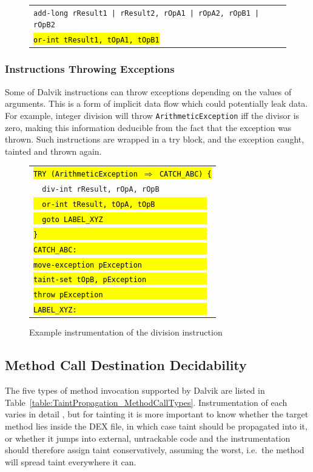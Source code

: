 \documentclass[12pt,twoside,notitlepage]{report}
\newcommand{\centerbox}[1] {
	\begin{center}
	\begin{footnotesize}
	\begin{tabular}{l}
		#1
	\end{tabular}
	\end{footnotesize}
	\end{center}
}
\newcommand{\asm}[1] {\texttt{#1}}
\newcommand{\asmExtra}[1] {\texttt{\hl{#1}}}
\begin{document}
	\begin{figure}[H]
		\centerbox{
			\asm{add-long rResult1 | rResult2, rOpA1 | rOpA2, rOpB1 | rOpB2} \\
			\asmExtra{or-int tResult1, tOpA1, tOpB1}
		}
	\end{figure}

\subsubsection{Instructions Throwing Exceptions}

Some of Dalvik instructions can throw exceptions depending on the values of arguments. This is a form of implicit data flow which could potentially leak data. For example, integer division will throw \verb$ArithmeticException$ iff the divisor is zero, making this information deducible from the fact that the exception was thrown. Such instructions are wrapped in a try block, and the exception caught, tainted and thrown again.

	\begin{figure}[H]
		\centerbox{
			\asmExtra{TRY (ArithmeticException $\Rightarrow$ CATCH\_ABC) \{} \\
			\asm{~~div-int rResult, rOpA, rOpB} \\
			\asmExtra{~~or-int tResult, tOpA, tOpB~~~~~~~~~~~~} \\
			\asmExtra{~~goto LABEL\_XYZ~~~~~~~~~~~~~~~~~~~~~~~~} \\
			\asmExtra{\}~~~~~~~~~~~~~~~~~~~~~~~~~~~~~~~~~~~~~~~} \\
			\asmExtra{CATCH\_ABC:~~~~~~~~~~~~~~~~~~~~~~~~~~~~~~} \\
			\asmExtra{move-exception pException~~~~~~~~~~~~~~~} \\
			\asmExtra{taint-set tOpB, pException~~~~~~~~~~~~~~} \\
			\asmExtra{throw pException~~~~~~~~~~~~~~~~~~~~~~~~} \\	
			\asmExtra{LABEL\_XYZ:~~~~~~~~~~~~~~~~~~~~~~~~~~~~~~}
		}
		\caption{Example instrumentation of the division instruction}
		\label{figure:TaintPropagation_ThrowingInstructions}
	\end{figure}

\subsection{Method Call Destination Decidability}
\label{section:TaintPropagation_DestDecision}

The five types of method invocation supported by Dalvik are listed in Table~\ref{table:TaintPropagation_MethodCallTypes}. Instrumentation of each varies in detail
, but for tainting it is more important to know whether the target method lies inside the DEX file, in which case taint should be propagated into it, or whether it jumps into external, untrackable code and the instrumentation should therefore assign taint conservatively, assuming the worst, i.e.\ the method will spread taint everywhere it can.
\end{document}
